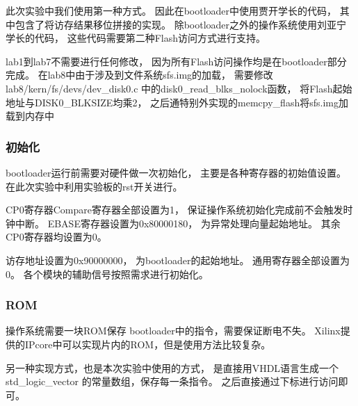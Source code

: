             此次实验中我们使用第一种方式。
            因此在bootloader中使用贾开学长的代码，
            其中包含了将访存结果移位拼接的实现。
            除bootloader之外的操作系统使用刘亚宁学长的代码，
            这些代码需要第二种Flash访问方式进行支持。

            lab1到lab7不需要进行任何修改，
            因为所有Flash访问操作均是在bootloader部分完成。
            在lab8中由于涉及到文件系统sfs.img的加载，
            需要修改lab8/kern/fs/devs/dev\_disk0.c
            中的disk0\_read\_blks\_nolock函数，
            将Flash起始地址与DISK0\_BLKSIZE均乘2，
            之后通特别外实现的memcpy\_flash将sfs.img加载到内存中

        \subsubsection{初始化}
            bootloader运行前需要对硬件做一次初始化，
            主要是各种寄存器的初始值设置。
            在此次实验中利用实验板的rst开关进行。

            CP0寄存器Compare寄存器全部设置为1，
            保证操作系统初始化完成前不会触发时钟中断。
            EBASE寄存器设置为0x80000180，
            为异常处理向量起始地址。
            其余CP0寄存器均设置为0。

            访存地址设置为0x90000000，
            为bootloader的起始地址。
            通用寄存器全部设置为0。
            各个模块的辅助信号按照需求进行初始化。

        \subsubsection{ROM}
            操作系统需要一块ROM保存
            bootloader中的指令，需要保证断电不失。
            Xilinx提供的IPcore中可以实现片内的ROM，但是使用方法比较复杂。

            另一种实现方式，也是本次实验中使用的方式，
            是直接用VHDL语言生成一个std\_logic\_vector
            的常量数组，保存每一条指令。
            之后直接通过下标进行访问即可。
            